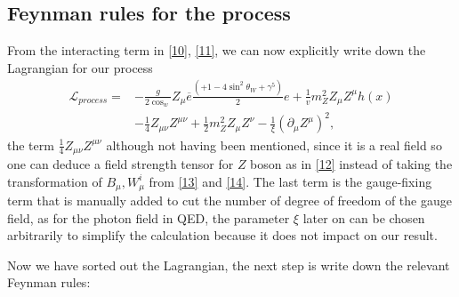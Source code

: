 \documentclass{report}
\numberwithin{equation}{section}
\begin{document}
\subsection{Feynman rules for the process}
From the interacting term in \eqref{10}, \eqref{11}, we can now explicitly write down the Lagrangian for our process
\begin{equation}
\begin{split}
\mathcal{L}_{process}=&-\frac{g}{2\cos_w}Z_\mu \overline{e}\frac{(+1-4 \sin^2\theta_W+\gamma^5)}{2}e+\frac{1}{v} m_Z^2Z_\mu Z^\mu h(x)\\
&-\frac{1}{4}Z_{\mu \nu}Z^{\mu \nu}+\frac{1}{2}m^2_Z Z_\mu Z^\nu- \frac{1}{\xi}(\partial_\mu Z^\mu)^2,
\end{split}
\end{equation}
the term $\frac{1}{4}Z_{\mu \nu}Z^{\mu \nu}$ although not having been mentioned, since it is a real field so one can deduce a field strength tensor for $Z$ boson as in \eqref{12} instead of taking the transformation of $B_\mu,W_\mu^i$  from \eqref{13} and  \eqref{14}.  The last term is the gauge-fixing term that is manually added to cut the number of degree of freedom of the gauge field, as for the photon field in QED, the parameter $\xi$ later on can be chosen arbitrarily to simplify the calculation because it does not impact on our  result.\par
Now we have sorted out the Lagrangian, the next step is write down the relevant Feynman rules:\\
\end{document}
